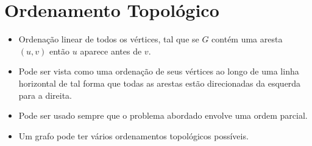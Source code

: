 
\section{Ordenamento Topológico}
\begin{frame}
	\begin{itemize}
		\item Ordenação linear de todos os vértices, tal que se $G$ contém uma 
		aresta $(u, v)$ então $u$ aparece antes de $v$.
		\item Pode ser vista como uma ordenação de seus vértices ao longo de uma 
		linha horizontal de tal forma que todas as arestas estão direcionadas da 
		esquerda para a direita.
		\item Pode ser usado sempre que o problema abordado envolve uma ordem parcial.
		\item Um grafo pode ter vários ordenamentos topológicos possíveis.
	\end{itemize}
\end{frame}

